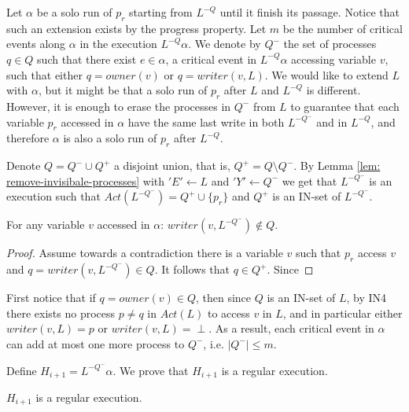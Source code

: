 Let $\alpha$ be a solo run of $p_r$ starting from $L^{-Q}$ until it finish its passage. Notice that such an extension exists by the progress property. Let $m$ be the number of critical events along $\alpha$ in the execution $L^{-Q} \alpha$.
We denote by $Q^-$ the set of processes $q \in Q$ such that there exist $e \in \alpha$, a critical event in $L^{-Q} \alpha$ accessing variable $v$, such that either $q = owner(v)$ or $q = writer(v,L)$.
We would like to extend $L$ with $\alpha$, but it might be that a solo run of $p_r$ after $L$ and $L^{-Q}$ is different. However, it is enough to erase the processes in $Q^-$ from $L$ to guarantee that each variable $p_r$ accessed in $\alpha$ have the same last write in both $L^{-Q^-}$ and in $L^{-Q}$, and therefore $\alpha$ is also a solo run of $p_r$ after $L^{-Q}$.

Denote $Q = Q^- \cup Q^+$ a disjoint union, that is, $Q^+ = Q \setminus Q^-$. By Lemma \ref{lem: remove-invisibale-processes} with $'E' \leftarrow L$ and $'Y' \leftarrow Q^-$ we get that $L^{-Q^-}$ is an execution such that $Act(L^{-Q^-}) = Q^+ \cup \{p_r\}$ and $Q^+$ is an IN-set of $L^{-Q^-}$.

\begin{claim-subsection}
	For any variable $v$ accessed in $\alpha$: $writer(v,L^{-Q^-}) \notin Q$.
\end{claim-subsection}

\begin{proof}
	Assume towards a contradiction there is a variable $v$ such that $p_r$ access $v$ and $q = writer(v,L^{-Q^-}) \in Q$. It follows that $q \in Q^+$. Since 
\end{proof}

First notice that if $q = owner(v) \in Q$, then since $Q$ is an IN-set of $L$, by IN4 there exists no process $p \neq q$ in $Act(L)$ to access $v$ in $L$, and in particular either $writer(v,L) = p$ or $writer(v,L) = \perp$.
As a result, each critical event in $\alpha$ can add at most one more process to $Q^-$, i.e. $|Q^-| \leq m$.

Define $H_{i+1} = L^{-Q^-} \alpha$. We prove that $H_{i+1}$ is a regular execution.

\begin{claim-subsection}
	$H_{i+1}$ is a regular execution.
\end{claim-subsection}

